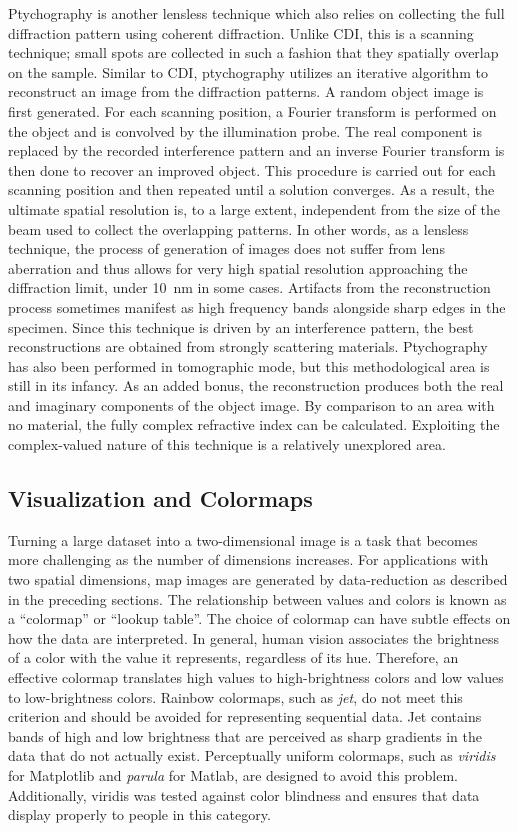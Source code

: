 \documentclass[journal=cmatex,manuscript=perspective]{achemso}
\begin{document}
Ptychography is another lensless technique which also relies on
collecting the full diffraction pattern using coherent
diffraction. Unlike CDI, this is a scanning technique; small spots are
collected in such a fashion that they spatially overlap on the
sample. Similar to CDI, ptychography utilizes an iterative algorithm
to reconstruct an image from the diffraction patterns. A random object
image is first generated. For each scanning position, a Fourier
transform is performed on the object and is convolved by the
illumination probe. The real component is replaced by the recorded
interference pattern and an inverse Fourier transform is then done to
recover an improved object. This procedure is carried out for each
scanning position and then repeated until a solution converges. As a
result, the ultimate spatial resolution is, to a large extent,
independent from the size of the beam used to collect the overlapping
patterns. In other words, as a lensless technique, the process of
generation of images does not suffer from lens aberration and thus
allows for very high spatial resolution approaching the diffraction
limit, under \SI{10}{nm} in some cases. Artifacts from the
reconstruction process sometimes manifest as high frequency bands
alongside sharp edges in the specimen. Since this technique is driven
by an interference pattern, the best reconstructions are obtained from
strongly scattering materials. Ptychography has also been performed in
tomographic mode\cite{venkatakrishnan2016}, but this methodological
area is still in its infancy. As an added bonus, the reconstruction
produces both the real and imaginary components of the object
image. By comparison to an area with no material, the fully complex
refractive index can be calculated. Exploiting the complex-valued
nature of this technique is a relatively unexplored area.

\subsection{Visualization and Colormaps}

Turning a large dataset into a two-dimensional image is a task that
becomes more challenging as the number of dimensions increases. For
applications with two spatial dimensions, map images are generated by
data-reduction as described in the preceding sections. The
relationship between values and colors is known as a ``colormap'' or
``lookup table''. The choice of colormap can have subtle effects on
how the data are interpreted. In general, human vision associates the
brightness of a color with the value it represents, regardless of its
hue. Therefore, an effective colormap translates high values to
high-brightness colors and low values to low-brightness
colors. Rainbow colormaps, such as \emph{jet}, do not meet this
criterion and should be avoided for representing sequential data. Jet
contains bands of high and low brightness that are perceived as sharp
gradients in the data that do not actually exist. Perceptually uniform
colormaps, such as \emph{viridis} for Matplotlib and \emph{parula} for
Matlab, are designed to avoid this problem. Additionally, viridis was
tested against color blindness and ensures that data display properly
to people in this category.
\end{document}
